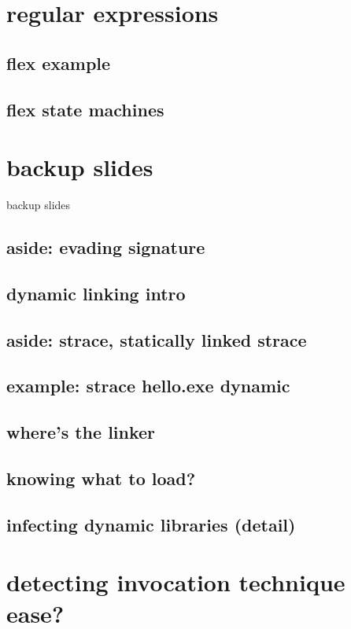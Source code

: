 \section{regular expressions}


\subsection{flex example}


\subsection{flex state machines}


\section{backup slides}
\begin{frame}{backup slides}
\end{frame}



\subsection{aside: evading signature}



\subsection{dynamic linking intro}


\subsection{aside: strace, statically linked strace}


\subsection{example: strace hello.exe dynamic}


\subsection{where's the linker}


\subsection{knowing what to load?}


\subsection{infecting dynamic libraries (detail)}


\section{detecting invocation technique ease?}





